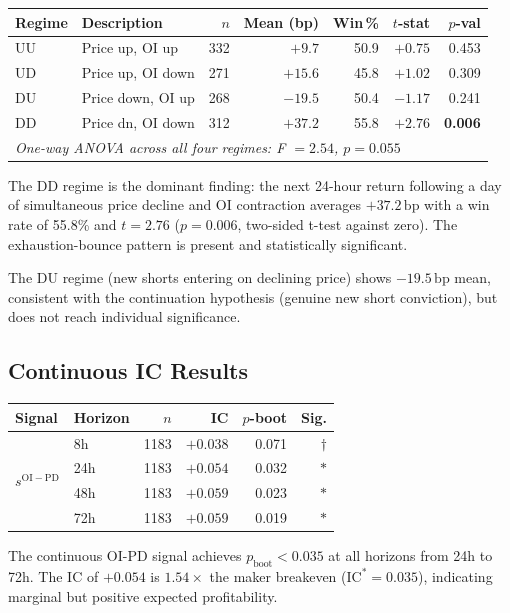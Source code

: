 \documentclass[12pt, a4paper]{article}
\theoremstyle{plain}
\theoremstyle{definition}
\newcommand{\IC}{\mathrm{IC}}
\newcommand{\bp}{\,\mathrm{bp}}
\begin{document}
\begin{center}
\begin{tabular}{llrrrrr}
\toprule
Regime & Description & $n$ & Mean (bp) & Win\,\% & $t$-stat & $p$-val \\
\midrule
UU & Price up, OI up   & 332 & $+9.7$  & 50.9 & $+0.75$ & 0.453 \\
UD & Price up, OI down & 271 & $+15.6$ & 45.8 & $+1.02$ & 0.309 \\
DU & Price down, OI up & 268 & $-19.5$ & 50.4 & $-1.17$ & 0.241 \\
DD & Price dn, OI down & 312 & $+37.2$ & 55.8 & $+2.76$ & \textbf{0.006} \\
\midrule
\multicolumn{7}{l}{\textit{One-way ANOVA across all four regimes: F $= 2.54$, $p = 0.055$}} \\
\bottomrule
\end{tabular}
\end{center}

The DD regime is the dominant finding: the next 24-hour return following
a day of simultaneous price decline and OI contraction averages $+37.2\bp$
with a win rate of 55.8\% and $t = 2.76$ ($p = 0.006$, two-sided
t-test against zero).  The exhaustion-bounce pattern is present and
statistically significant.

The DU regime (new shorts entering on declining price) shows $-19.5\bp$
mean, consistent with the continuation hypothesis (genuine new short
conviction), but does not reach individual significance.

\subsection{Continuous IC Results}

\begin{center}
\begin{tabular}{llrrrr}
\toprule
Signal & Horizon & $n$ & IC & $p$-boot & Sig. \\
\midrule
\multirow{4}{*}{$s^{\mathrm{OI-PD}}$}
  & 8h  & 1183 & $+0.038$ & 0.071 & $\dagger$ \\
  & 24h & 1183 & $+0.054$ & 0.032 & $*$ \\
  & 48h & 1183 & $+0.059$ & 0.023 & $*$ \\
  & 72h & 1183 & $+0.059$ & 0.019 & $*$ \\
\bottomrule
\end{tabular}
\end{center}

The continuous OI-PD signal achieves $p_{\mathrm{boot}} < 0.035$ at all
horizons from 24h to 72h.  The IC of $+0.054$ is $1.54\times$ the maker
breakeven ($\IC^* = 0.035$), indicating marginal but positive expected
profitability.
\end{document}
